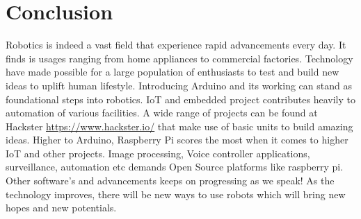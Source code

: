 \chapter*{Conclusion}
\begin{fullwidth}
Robotics is indeed a vast field that experience rapid advancements every day. It finds is usages ranging from home appliances to commercial factories. Technology have made possible for a large population of enthusiasts to test and build new ideas to uplift human lifestyle. Introducing Arduino and its working can stand as foundational steps into robotics. \ac{IoT} and embedded project contributes heavily to automation of various facilities. A wide range of projects can be found at Hackster \url{https://www.hackster.io/} that make use of basic units to build amazing ideas. Higher to Arduino, Raspberry Pi scores the most when it comes to higher \ac{IoT} and other projects. Image processing, Voice controller applications, surveillance, automation etc demands Open Source platforms like raspberry pi. Other software's and advancements keeps on progressing as we speak! As the technology improves, there will be new ways to use robots which will bring new hopes and new potentials. 
\end{fullwidth}